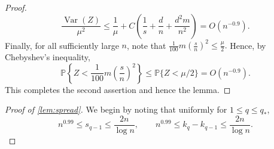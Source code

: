 \documentclass[reqno,english]{amsart}
\newcommand*{\PP}{\mathbb P}
\newcommand*{\Var}{\operatorname{Var}}
\theoremstyle{definition}
\begin{document}
\begin{proof}
$$
    \frac{\Var(Z)}{\mu^2}
    \le \frac1\mu
       +C\left(\frac1s+\frac dn+\frac{d^2m}{n^2}\right)
    =O(n^{-0.9}).
$$
Finally, for all sufficiently large $n$, note that
$    \frac1{100}m\left(\frac{s}{n}\right)^2\le\frac\mu2. 
$
Hence, by Chebyshev's inequality, 
\[
    \PP\left\{Z {<} \frac1{100}m\left(\frac{s}{n}\right)^2\right\} \le \PP\{Z {<} \mu/2\} = O(n^{-0.9}).
\]
This completes the second assertion and hence the lemma.
\end{proof}





\begin{proof}[Proof of \cref{lem:spread}]
We begin by noting that uniformly for $1\le q\le q_*$,
\begin{equation}\label{eq:spread-params} 
    n^{0.99}\le s_{q-1}\le \frac{2n}{\log n},
    \qquad
    n^{0.99}\le k_q-k_{q-1}\le \frac{2n}{\log n}.
\end{equation}



\end{proof}
\end{document}
